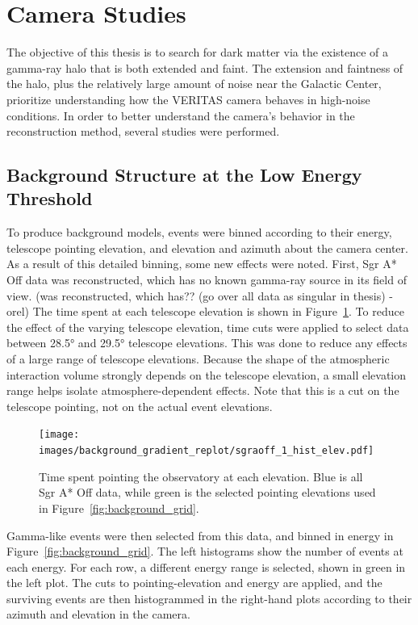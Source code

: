   \FloatBarrier

\section{Camera Studies}
The objective of this thesis is to search for dark matter via the existence of a gamma-ray halo that is both extended and faint.
The extension and faintness of the halo, plus the relatively large amount of noise near the Galactic Center, prioritize understanding how the VERITAS camera behaves in high-noise conditions.
In order to better understand the camera's behavior in the reconstruction method, several studies were performed.

\subsection{Background Structure at the Low Energy Threshold}\label{subsec:bkgstructure}
To produce background models, events were binned according to their energy, telescope pointing elevation, and elevation and azimuth about the camera center.
As a result of this detailed binning, some new effects were noted.
First, Sgr A* Off data was reconstructed, which has no known gamma-ray source in its field of view.
{\color{red}(was reconstructed, which has?? (go over all data as singular in thesis) -orel)}
The time spent at each telescope elevation is shown in Figure~\ref{fig:back_elevhist}.
To reduce the effect of the varying telescope elevation, time cuts were applied to select data between \ang{28.5} and \ang{29.5} telescope elevations.
This was done to reduce any effects of a large range of telescope elevations.
Because the shape of the atmospheric interaction volume strongly depends on the telescope elevation, a small elevation range helps isolate atmosphere-dependent effects.
Note that this is a cut on the telescope pointing, not on the actual event elevations.

\begin{figure}[bt]
  \centering
  \texttt{[image: images/background\_gradient\_replot/sgraoff\_1\_hist\_elev.pdf]}
  \caption[Elevation Slice of Sgr A* Off Data]{
    Time spent pointing the observatory at each elevation.
    Blue is all Sgr A* Off data, while green is the selected pointing elevations used in Figure~\ref{fig:background_grid}.
  }
  \label{fig:back_elevhist}
\end{figure}
    
Gamma-like events were then selected from this data, and binned in energy in Figure~\ref{fig:background_grid}.
The left histograms show the number of events at each energy.
For each row, a different energy range is selected, shown in green in the left plot.
The cuts to pointing-elevation and energy are applied, and the surviving events are then histogrammed in the right-hand plots according to their azimuth and elevation in the camera.
    
